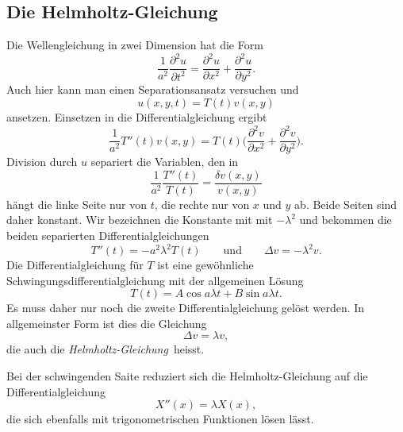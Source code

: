 \subsection{Die Helmholtz-Gleichung}
Die Wellengleichung in zwei Dimension hat die Form
\[
\frac{1}{a^2}
\frac{\partial^2u}{\partial t^2}
=
\frac{\partial^2 u}{\partial x^2}
+
\frac{\partial^2 u}{\partial y^2}.
\]
Auch hier kann man einen Separationsansatz versuchen und
\[
u(x,y,t) = T(t) v(x,y)
\]
ansetzen.
Einsetzen in die Differentialgleichung ergibt
\[
\frac{1}{a^2}
T''(t) v(x,y)
=
T(t)
\biggl(
\frac{\partial^2 v}{\partial x^2}
+
\frac{\partial^2 v}{\partial y^2}
\biggr).
\]
Division durch $u$ separiert die Variablen, den in
\[
\frac{1}{a^2}
\frac{T''(t)}{T(t)}
=
\frac{\delta v(x,y)}{v(x,y)}
\]
hängt die linke Seite nur von $t$, die rechte nur von $x$ und $y$ ab.
Beide Seiten sind daher konstant.
Wir bezeichnen die Konstante mit mit $-\lambda^2$ und bekommen die
beiden separierten Differentialgleichungen
\[
T''(t) = -a^2\lambda^2 T(t)
\qquad\text{und}\qquad
\Delta v = -\lambda^2 v.
\]
Die Differentialgleichung für $T$ ist eine gewöhnliche
Schwingungsdifferentialgleichung mit der allgemeinen Lösung
\[
T(t) = A\cos a\lambda t + B \sin a\lambda t.
\]
Es muss daher nur noch die zweite Differentialgleichung gelöst
werden.
In allgemeinster Form ist dies die Gleichung
\begin{equation}
\Delta v = \lambda v,
\end{equation}
die auch die {\em Helmholtz-Gleichung} heisst.
%

Bei der schwingenden Saite reduziert sich die Helmholtz-Gleichung
auf die Differentialgleichung
\[
X''(x) = \lambda X(x),
\]
die sich ebenfalls mit trigonometrischen Funktionen lösen lässt.



